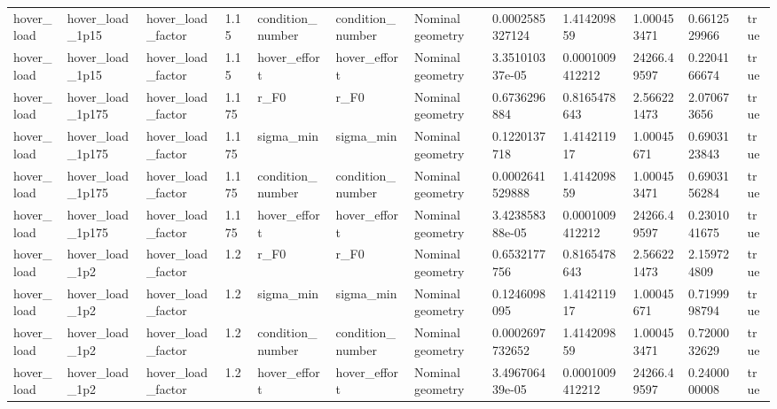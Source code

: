 \begin{tabular}{@{}llllllllllll@{}}
hover\_load & hover\_load\_1p15 & hover\_load\_factor & 1.15 & condition\_number & condition\_number & Nominal geometry & 0.0002585327124 & 1.414209859 & 1.000453471 & 0.6612529966 & true \\
hover\_load & hover\_load\_1p15 & hover\_load\_factor & 1.15 & hover\_effort & hover\_effort & Nominal geometry & 3.351010337e-05 & 0.0001009412212 & 24266.49597 & 0.2204166674 & true \\
hover\_load & hover\_load\_1p175 & hover\_load\_factor & 1.175 & r\_F0 & r\_F0 & Nominal geometry & 0.6736296884 & 0.8165478643 & 2.566221473 & 2.070673656 & true \\
hover\_load & hover\_load\_1p175 & hover\_load\_factor & 1.175 & sigma\_min & sigma\_min & Nominal geometry & 0.1220137718 & 1.414211917 & 1.00045671 & 0.6903123843 & true \\
hover\_load & hover\_load\_1p175 & hover\_load\_factor & 1.175 & condition\_number & condition\_number & Nominal geometry & 0.0002641529888 & 1.414209859 & 1.000453471 & 0.6903156284 & true \\
hover\_load & hover\_load\_1p175 & hover\_load\_factor & 1.175 & hover\_effort & hover\_effort & Nominal geometry & 3.423858388e-05 & 0.0001009412212 & 24266.49597 & 0.2301041675 & true \\
hover\_load & hover\_load\_1p2 & hover\_load\_factor & 1.2 & r\_F0 & r\_F0 & Nominal geometry & 0.6532177756 & 0.8165478643 & 2.566221473 & 2.159724809 & true \\
hover\_load & hover\_load\_1p2 & hover\_load\_factor & 1.2 & sigma\_min & sigma\_min & Nominal geometry & 0.1246098095 & 1.414211917 & 1.00045671 & 0.7199998794 & true \\
hover\_load & hover\_load\_1p2 & hover\_load\_factor & 1.2 & condition\_number & condition\_number & Nominal geometry & 0.0002697732652 & 1.414209859 & 1.000453471 & 0.7200032629 & true \\
hover\_load & hover\_load\_1p2 & hover\_load\_factor & 1.2 & hover\_effort & hover\_effort & Nominal geometry & 3.496706439e-05 & 0.0001009412212 & 24266.49597 & 0.2400000008 & true \\
\bottomrule
\end{tabular}
